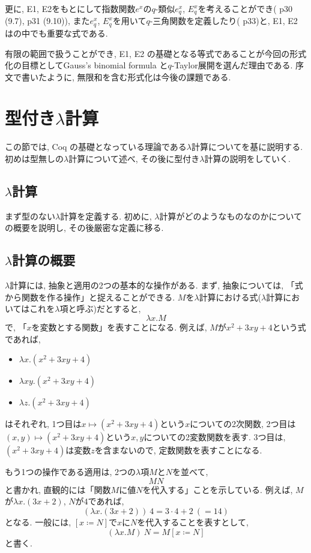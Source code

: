 \documentclass[11pt]{jsreport}
\theoremstyle{mystyle}
\newcommand{\0}{\textbf{0}}
\begin{document}
更に, E1, E2をもとにして指数関数$e^x$の$q$-類似$e^x_q$, $E^x_q$を考えることができ(\cite{Kac} p30 (9.7), p31 (9.10)), 
また$e^x_q$, $E^x_q$を用いて$q$-三角関数を定義したり(\cite{Kac} p33)と, E1, E2 は\cite{Kac}の中でも重要な式である. 

有限の範囲で扱うことができ,  E1, E2 の基礎となる等式であることが今回の形式化の目標としてGauss's binomial formula と$q$-Taylor展開を選んだ理由である. 序文で書いたように, 無限和を含む形式化は今後の課題である. 
\section{型付き$\lambda$計算} \label{sec lambda}
この節では, Coq の基礎となっている理論である$\lambda$計算について\cite{Bar}を基に説明する. 初めは型無しの$\lambda$計算について述べ, その後に型付き$\lambda$計算の説明をしていく. 
\subsection{$\lambda$計算} \label{ssec lambdacal}
まず型のない$\lambda$計算を定義する. 初めに, $\lambda$計算がどのようなものなのかについての概要を説明し, その後厳密な定義に移る.

\subsection*{$\lambda$計算の概要}
$\lambda$計算には, 抽象と適用の2つの基本的な操作がある. まず, 抽象については, 「式から関数を作る操作」と捉えることができる. $M$を$\lambda$計算における式($\lambda$計算においてはこれを$\lambda$項と呼ぶ)だとすると, 
\[
  \lambda x . M
\]
で, 「$x$を変数とする関数」を表すことになる. 
例えば, $M$が$x^2 + 3xy + 4$という式であれば, 
\begin{itemize}
  \item $\lambda x . (x^2 + 3xy + 4)$
  \item $\lambda xy . (x^2 + 3xy + 4)$
  \item $\lambda z . (x^2 + 3xy + 4)$
\end{itemize}
はそれぞれ, 1つ目は$x \mapsto (x^2 + 3xy + 4)$という$x$についての2次関数, 
2つ目は$(x, y) \mapsto (x^2 + 3xy + 4)$という$x, y$についての2変数関数を表す. 
3つ目は, $(x^2 + 3xy + 4)$は変数$z$を含まないので, 定数関数を表すことになる.

もう1つの操作である適用は, 2つの$\lambda$項$M$と$N$を並べて, 
\[
  MN
\]
と書かれ, 直観的には「関数$M$に値$N$を代入する」ことを示している. 
例えば, $M$が$\lambda x . (3x + 2)$, $N$が$4$であれば, 
\[
  (\lambda x . (3x + 2))\ 4 = 3 \cdot 4 + 2\ (= 14)
\]
となる. 一般には, $[x \coloneqq N]$で$x$に$N$を代入することを表すとして, 
\[
  (\lambda x. M)\ N = M[x\coloneqq N]
\]
と書く. 
\end{document}

